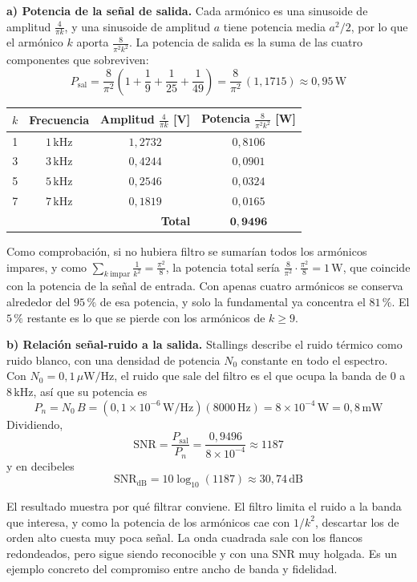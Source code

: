 \documentclass[11pt,a4paper]{article}
\begin{document}
\noindent\textbf{a) Potencia de la señal de salida.} Cada armónico es una sinusoide de amplitud $\frac{4}{\pi k}$, y una sinusoide de amplitud $a$ tiene potencia media $a^2/2$, por lo que el armónico $k$ aporta $\frac{8}{\pi^2k^2}$. La potencia de salida es la suma de las cuatro componentes que sobreviven:
\[
  P_{\mathrm{sal}}=\frac{8}{\pi^2}\left(1+\frac{1}{9}+\frac{1}{25}+\frac{1}{49}\right)
  =\frac{8}{\pi^2}\,(1{,}1715)\approx\boxed{0{,}95\,\mathrm{W}}
\]
\begin{center}
\begin{tabular}{|c|c|c|c|}
\hline
\textbf{$k$} & \textbf{Frecuencia} & \textbf{Amplitud $\frac{4}{\pi k}$ [V]} & \textbf{Potencia $\frac{8}{\pi^2k^2}$ [W]} \\
\hline
1 & $1\,\mathrm{kHz}$ & $1{,}2732$ & $0{,}8106$ \\
\hline
3 & $3\,\mathrm{kHz}$ & $0{,}4244$ & $0{,}0901$ \\
\hline
5 & $5\,\mathrm{kHz}$ & $0{,}2546$ & $0{,}0324$ \\
\hline
7 & $7\,\mathrm{kHz}$ & $0{,}1819$ & $0{,}0165$ \\
\hline
\multicolumn{3}{|r|}{\textbf{Total}} & $\mathbf{0{,}9496}$ \\
\hline
\end{tabular}
\end{center}
Como comprobación, si no hubiera filtro se sumarían todos los armónicos impares, y como $\sum_{k\ \mathrm{impar}}\frac{1}{k^2}=\frac{\pi^2}{8}$, la potencia total sería $\frac{8}{\pi^2}\cdot\frac{\pi^2}{8}=1\,\mathrm{W}$, que coincide con la potencia de la señal de entrada. Con apenas cuatro armónicos se conserva alrededor del $95\,\%$ de esa potencia, y solo la fundamental ya concentra el $81\,\%$. El $5\,\%$ restante es lo que se pierde con los armónicos de $k\ge9$.

\noindent\textbf{b) Relación señal-ruido a la salida.} Stallings describe el ruido térmico como ruido blanco, con una densidad de potencia $N_0$ constante en todo el espectro. Con $N_0=0{,}1\,\mu\mathrm{W/Hz}$, el ruido que sale del filtro es el que ocupa la banda de $0$ a $8\,\mathrm{kHz}$, así que su potencia es
\[
  P_n=N_0\,B=(0{,}1\times10^{-6}\,\mathrm{W/Hz})(8000\,\mathrm{Hz})=8\times10^{-4}\,\mathrm{W}=0{,}8\,\mathrm{mW}
\]
Dividiendo,
\[
  \mathrm{SNR}=\frac{P_{\mathrm{sal}}}{P_n}=\frac{0{,}9496}{8\times10^{-4}}\approx1187
\]
y en decibeles
\[
  \mathrm{SNR}_{\mathrm{dB}}=10\log_{10}(1187)\approx\boxed{30{,}74\,\mathrm{dB}}
\]

El resultado muestra por qué filtrar conviene. El filtro limita el ruido a la banda que interesa, y como la potencia de los armónicos cae con $1/k^2$, descartar los de orden alto cuesta muy poca señal. La onda cuadrada sale con los flancos redondeados, pero sigue siendo reconocible y con una SNR muy holgada. Es un ejemplo concreto del compromiso entre ancho de banda y fidelidad.

\newpage
\end{document}
